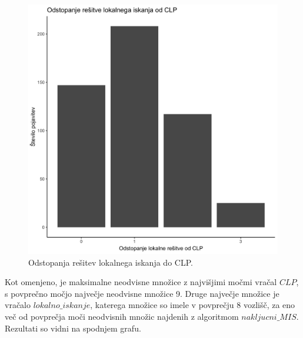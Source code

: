 \documentclass[a4paper, 12pt]{article}
\begin{document}
\begin{figure}[h!]
	\begin{center}
		\includegraphics[scale=0.11]{R_koda/pon-napake.png}
		\caption{Odstopanja rešitev lokalnega iskanja do CLP.}
	\end{center}
\end{figure}

\noindent Kot omenjeno, je maksimalne neodvisne množice z najvišjimi močmi vračal $CLP$, s povprečno močjo največje neodvisne množice 9. Druge največje množice je vračalo $lokalno\_iskanje$,
katerega množice so imele v povprečju 8 vozlišč, za eno več od povprečja moči neodvisnih množic najdenih z algoritmom $nakljucni\_MIS$. Rezultati so vidni na spodnjem grafu.
\end{document}
